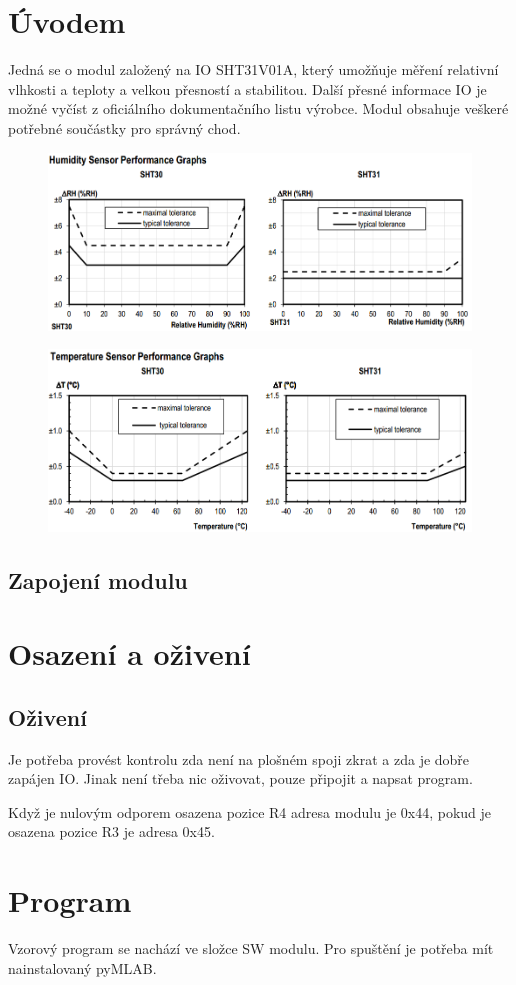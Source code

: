 \documentclass[12pt,a4paper,final,titlepage,twoside]{article}
\begin{document}



\section{Úvodem}
Jedná se o modul založený na IO SHT31V01A, který umožňuje měření relativní vlhkosti a teploty a velkou přesností a stabilitou. Další přesné informace IO je možné vyčíst z oficiálního dokumentačního listu výrobce. Modul obsahuje veškeré potřebné součástky pro správný chod.
\begin{figure}[h!]
\centering
\includegraphics[width=\textwidth]{SHPG.png}
\end{figure}
\begin{figure}[h!]
\centering
\includegraphics[width=\textwidth]{THPG.png}
\end{figure}


\hfill\subsection{Zapojení modulu}


\section{Osazení a oživení}

\subsection{Oživení}
Je potřeba provést kontrolu zda není na plošném spoji zkrat a zda je dobře zapájen IO. Jinak není třeba nic oživovat, pouze připojit a napsat program.

Když je nulovým odporem osazena pozice R4 adresa modulu je 0x44, pokud je osazena pozice R3 je adresa 0x45.
\section{Program}
Vzorový program se nachází ve složce SW modulu. Pro spuštění je potřeba mít nainstalovaný  pyMLAB.
\end{document}
